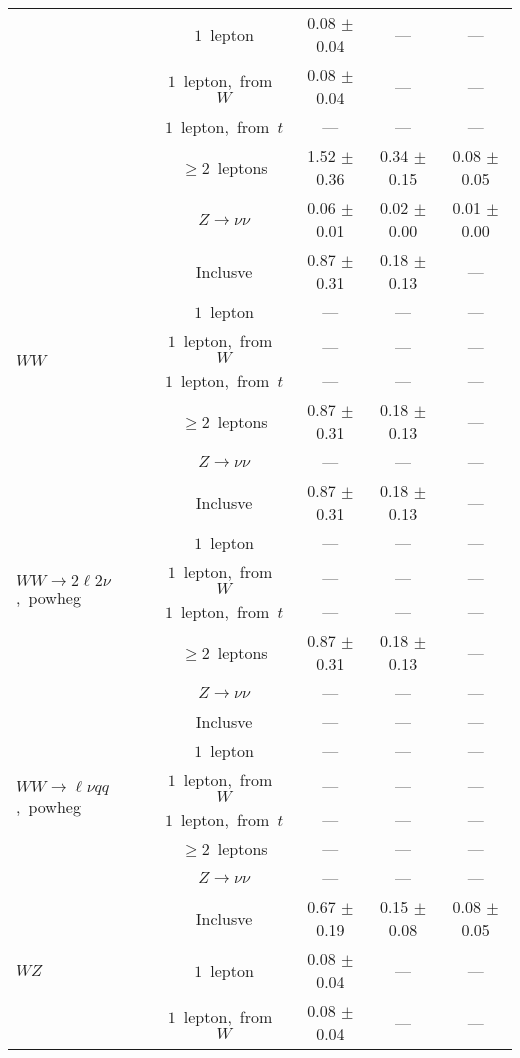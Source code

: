 \documentclass{article}
\begin{document}
\begin{longtable}{|l|c|c|c|c|}
 & $1$~lepton  & 0.08 $\pm$ 0.04  & ---  & --- \\* 
 & $1$~lepton,~from~$W$  & 0.08 $\pm$ 0.04  & ---  & --- \\* 
 & $1$~lepton,~from~$t$  & ---  & ---  & --- \\* 
 & $\ge2$~leptons  & 1.52 $\pm$ 0.36  & 0.34 $\pm$ 0.15  & 0.08 $\pm$ 0.05 \\* 
 & $Z\rightarrow\nu\nu$  & 0.06 $\pm$ 0.01  & 0.02 $\pm$ 0.00  & 0.01 $\pm$ 0.00 \\* 
\hline 
\multirow{6}{*}{$WW$} & Inclusve  & 0.87 $\pm$ 0.31  & 0.18 $\pm$ 0.13  & --- \\* 
 & $1$~lepton  & ---  & ---  & --- \\* 
 & $1$~lepton,~from~$W$  & ---  & ---  & --- \\* 
 & $1$~lepton,~from~$t$  & ---  & ---  & --- \\* 
 & $\ge2$~leptons  & 0.87 $\pm$ 0.31  & 0.18 $\pm$ 0.13  & --- \\* 
 & $Z\rightarrow\nu\nu$  & ---  & ---  & --- \\* 
\hline 
\multirow{6}{*}{$WW{\rightarrow}2\ell2\nu$,~powheg} & Inclusve  & 0.87 $\pm$ 0.31  & 0.18 $\pm$ 0.13  & --- \\* 
 & $1$~lepton  & ---  & ---  & --- \\* 
 & $1$~lepton,~from~$W$  & ---  & ---  & --- \\* 
 & $1$~lepton,~from~$t$  & ---  & ---  & --- \\* 
 & $\ge2$~leptons  & 0.87 $\pm$ 0.31  & 0.18 $\pm$ 0.13  & --- \\* 
 & $Z\rightarrow\nu\nu$  & ---  & ---  & --- \\* 
\hline 
\multirow{6}{*}{$WW{\rightarrow}{\ell}{\nu}qq$,~powheg} & Inclusve  & ---  & ---  & --- \\* 
 & $1$~lepton  & ---  & ---  & --- \\* 
 & $1$~lepton,~from~$W$  & ---  & ---  & --- \\* 
 & $1$~lepton,~from~$t$  & ---  & ---  & --- \\* 
 & $\ge2$~leptons  & ---  & ---  & --- \\* 
 & $Z\rightarrow\nu\nu$  & ---  & ---  & --- \\* 
\hline 
\multirow{6}{*}{$WZ$} & Inclusve  & 0.67 $\pm$ 0.19  & 0.15 $\pm$ 0.08  & 0.08 $\pm$ 0.05 \\* 
 & $1$~lepton  & 0.08 $\pm$ 0.04  & ---  & --- \\* 
 & $1$~lepton,~from~$W$  & 0.08 $\pm$ 0.04  & ---  & --- \\* 

\end{longtable}
\end{document}
